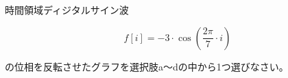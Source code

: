 時間領域ディジタルサイン波 

\[
f[i] = -3 \cdot \cos \left ( \frac{2 \pi}{7}  \cdot i \right )
\]

\noindent の位相を反転させたグラフを選択肢a〜dの中から1つ選びなさい。
